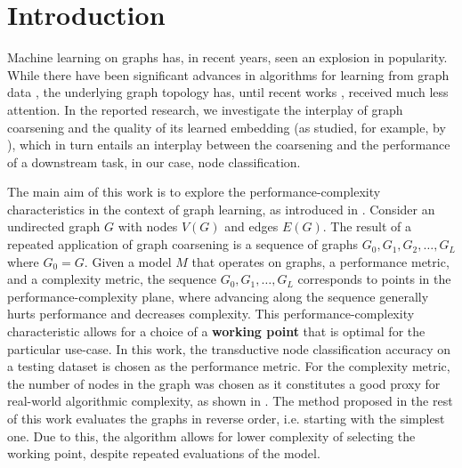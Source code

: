 \section{Introduction}\label{sec:introduction}
Machine learning on graphs has, in recent years, seen an explosion in popularity. While there have been significant advances in algorithms for learning from graph data \cite{defferrard_convolutional_2016,kipf_semi-supervised_2017}, the underlying graph topology has, until recent works \cite{topping_understanding_2021,velickovic_geometric_2021}, received much less attention. In the reported research, we investigate the interplay of graph coarsening and the quality of its learned embedding (as studied, for example, by \cite{akyildiz_understanding_2020,makarov_survey_2021}), which in turn entails an interplay between the coarsening and the performance of a downstream task, in our case, node classification.

The main aim of this work is to explore the performance-complexity characteristics in the context of graph learning, as introduced in \cite{prochazka_downstream_2022}. Consider an undirected graph \( G \) with nodes \( V \left( G \right) \) and edges \( E \left( G \right) \). The result of a repeated application of graph coarsening is a sequence of graphs \( G_0, G_1, G_2, \dots, G_L \) where \( G_0 = G \). Given a model \( M \) that operates on graphs, a performance metric, and a complexity metric, the sequence \( G_0, G_1, \dots, G_L \) corresponds to points in the performance-complexity plane, where advancing along the sequence generally hurts performance and decreases complexity. This performance-complexity characteristic allows for a choice of a \textbf{working point} that is optimal for the particular use-case. In this work, the transductive node classification accuracy on a testing dataset is chosen as the performance metric. For the complexity metric, the number of nodes in the graph was chosen as it constitutes a good proxy for real-world algorithmic complexity, as shown in \cite{chiang_cluster-gcn_2019}. The method proposed in the rest of this work evaluates the graphs in reverse order, i.e. starting with the simplest one. Due to this, the algorithm allows for lower complexity of selecting the working point, despite repeated evaluations of the model.
